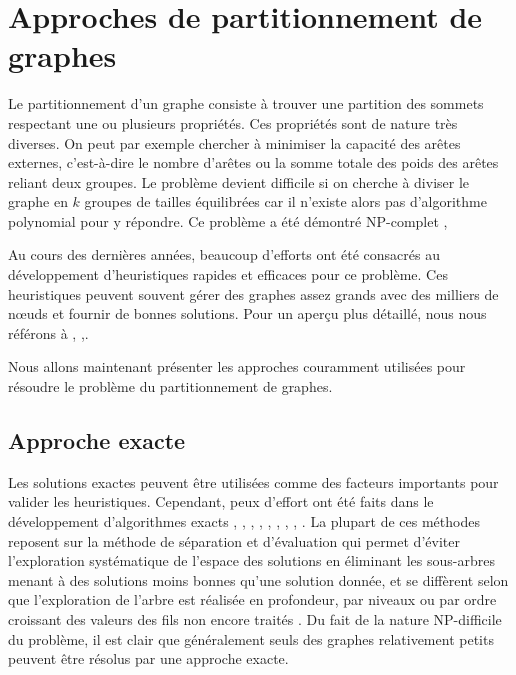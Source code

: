 
\section{Approches de partitionnement de graphes}
 Le partitionnement d'un graphe consiste à trouver une partition des sommets respectant une ou plusieurs propriétés. Ces propriétés sont de nature très diverses. On peut par exemple chercher à minimiser la capacité des arêtes externes, c'est-à-dire le nombre d'arêtes ou la somme totale des poids des arêtes reliant deux groupes.  Le problème devient difficile si on cherche à diviser le graphe en $k$ groupes de tailles équilibrées car il n'existe alors pas d'algorithme polynomial pour y répondre. Ce problème a été démontré NP-complet \citep{HYAFIL1973}, \citep{GAREY1976}

Au cours des dernières années, beaucoup d'efforts ont été consacrés au développement d'heuristiques rapides et efficaces pour ce problème. Ces heuristiques peuvent souvent gérer des graphes assez grands avec des milliers de nœuds et fournir de bonnes solutions. Pour un aperçu plus détaillé, nous nous référons à \citep{BichotSiarry2013}, \citep{BULU2016},\citep{SCHLOEGEL2000}.

Nous allons maintenant présenter les approches couramment utilisées pour résoudre le problème du partitionnement de graphes.


\subsection*{Approche exacte}
Les solutions exactes peuvent être utilisées comme des facteurs importants pour valider les heuristiques. Cependant, peux d'effort ont été faits dans le développement d'algorithmes exacts \citep{Armbruster2008}, \citep{Bonami2012}, \citep{Delling2012}, \citep{FeldmannWidmayer2015}, \citep{Ferreira1998}, \citep{Hager2013}, \citep{Kaibel2011}, \citep{Sellmann2003}, \citep{Sorensen2007}. La plupart de ces méthodes reposent sur la méthode de séparation et d'évaluation qui permet d'éviter l'exploration systématique de l'espace des solutions en éliminant les sous-arbres menant à des solutions moins bonnes qu'une solution donnée, et se diffèrent selon que l'exploration de l'arbre est réalisée en profondeur, par niveaux ou par ordre croissant des valeurs des fils non encore traités \citep{Land2010}.
Du fait de la nature NP-difficile du problème, il est clair que généralement seuls des graphes relativement petits peuvent être résolus par une approche exacte.

